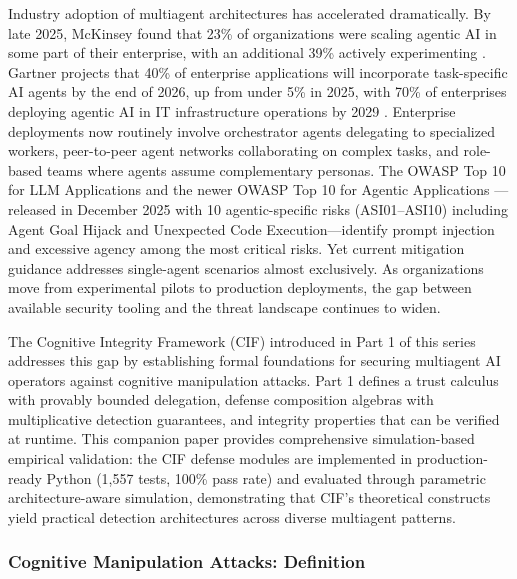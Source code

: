 \documentclass[
]{article}
\begin{document}
Industry adoption of multiagent architectures has accelerated
dramatically. By late 2025, McKinsey found that 23\% of organizations
were scaling agentic AI in some part of their enterprise, with an
additional 39\% actively experimenting \cite{mckinsey2025agentic}.
Gartner projects that 40\% of enterprise applications will incorporate
task-specific AI agents by the end of 2026, up from under 5\% in 2025,
with 70\% of enterprises deploying agentic AI in IT infrastructure
operations by 2029 \cite{gartner2025agentic}. Enterprise deployments now
routinely involve orchestrator agents delegating to specialized workers,
peer-to-peer agent networks collaborating on complex tasks, and
role-based teams where agents assume complementary personas. The OWASP
Top 10 for LLM Applications \cite{owasp2025llm} and the newer OWASP Top
10 for Agentic Applications \cite{owasp2025agentic}---released in
December 2025 with 10 agentic-specific risks (ASI01--ASI10) including
Agent Goal Hijack and Unexpected Code Execution---identify prompt
injection and excessive agency among the most critical risks. Yet
current mitigation guidance addresses single-agent scenarios almost
exclusively. As organizations move from experimental pilots to
production deployments, the gap between available security tooling and
the threat landscape continues to widen.

The Cognitive Integrity Framework (CIF) introduced in Part 1 of this
series addresses this gap by establishing formal foundations for
securing multiagent AI operators against cognitive manipulation attacks.
Part 1 defines a trust calculus with provably bounded delegation,
defense composition algebras with multiplicative detection guarantees,
and integrity properties that can be verified at runtime. This companion
paper provides comprehensive simulation-based empirical validation: the
CIF defense modules are implemented in production-ready Python (1,557
tests, 100\% pass rate) and evaluated through parametric
architecture-aware simulation, demonstrating that CIF's theoretical
constructs yield practical detection architectures across diverse
multiagent patterns.

\subsubsection{Cognitive Manipulation Attacks:
Definition}\label{cognitive-manipulation-attacks-definition}
\end{document}
